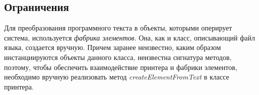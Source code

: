 \subsection{Ограничения}
Для преобразования программного текста в объекты, которыми оперирует система, используется \emph{фабрика элементов}.
Она, как и класс, описывающий файл языка, создается вручную.
Причем заранее неизвестно, каким образом инстанциируются объекты данного класса, неизвестна сигнатура методов, поэтому, чтобы обеспечить взаимодействие принтера и фабрики элементов, необходимо вручную реализовать метод \emph{createElementFromText} в классе принтера.
